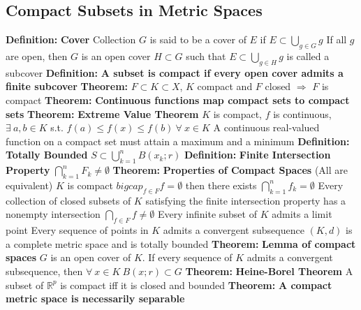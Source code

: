 \documentclass[14pt]{extarticle}
\def\Definition{{\color{Blue} \textbf{Definition:} }}
\def\Theorem{{\color{Red} \textbf{Theorem:} }}
\begin{document}
\begin{outline}
		\section{Compact Subsets in Metric Spaces}
		\1	\Definition \textbf{Cover}
			\2	Collection $G$ is said to be a cover of $E$ if $E \subset \bigcup_{g \in G} g$
			\2	If all $g$ are open, then $G$ is an open cover
			\2	$H \subset G$ such that $E \subset \bigcup_{g \in H} g$ is called a subcover
		\1	\Definition \textbf{A subset is compact if every open cover admits a finite subcover}
		\1	\Theorem	$F \subset K \subset X$, $K$ compact and $F$ closed $\Rightarrow$ $F$ is compact
		\1	\Theorem \textbf{Continuous functions map compact sets to compact sets}	
		\1	\Theorem	\textbf{Extreme Value Theorem}
			\2	$K$ is compact, $f$ is continuous, $\exists~a,b \in K$ s.t. 
					$f(a) \le f(x) \le f(b)~\forall~x \in K$
			\2	A continuous real-valued function on a compact set must attain a maximum
					and a minimum	
		\1	\Definition \textbf{Totally Bounded}
			\2	$S \subset \bigcup_{k=1}^n B(x_k;r)$
		\1	\Definition \textbf{Finite Intersection Property}
			\2	$\bigcap_{k=1}^n F_k \ne \emptyset$
		\1	\Theorem \textbf{Properties of Compact Spaces} (All are equivalent)
			\2	$K$ is compact
			\2	$bigcap_{f \in F} f = \emptyset$ then there exists $\bigcap_{k=1}^n f_k = \emptyset$
			\2	Every collection of closed subsets of $K$ satisfying the finite 
					intersection property has a nonempty intersection $\bigcap_{f \in F} f \ne \emptyset$
			\2	Every infinite subset of $K$ admits a limit point
			\2	Every sequence of points in $K$ admits a convergent subsequence
			\2	$(K,d)$ is a complete metric space and is totally bounded
		\1	\Theorem \textbf{Lemma of compact spaces}
			\2	$G$ is an open cover of $K$.  If every sequence of $K$ admits a 
					convergent subsequence, then $\forall~x\in K~B(x;r) \subset G$
		\1	\Theorem	\textbf{Heine-Borel Theorem}
			\2	A subset of $\mathbb{R}^p$ is compact iff it is closed and bounded
		\1	\Theorem	\textbf{A compact metric space is necessarily separable}

\end{outline}
\end{document}
